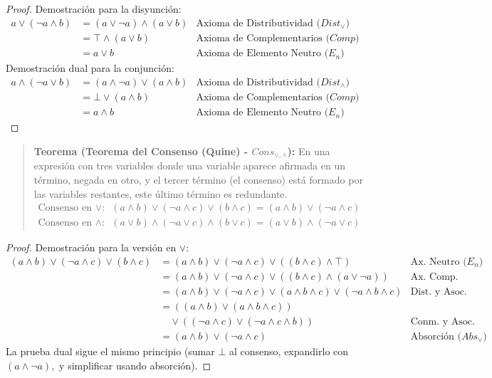 \begin{proof}
Demostración para la disyunción:
\begin{align*}
    a \vee (\neg a \wedge b) &= (a \vee \neg a) \wedge (a \vee b) & \text{Axioma de Distributividad ($Dist_{\vee}$)} \\
    &= \top \wedge (a \vee b) & \text{Axioma de Complementarios ($Comp$)} \\
    &= a \vee b & \text{Axioma de Elemento Neutro ($E_n$)}
\end{align*}
Demostración dual para la conjunción:
\begin{align*}
    a \wedge (\neg a \vee b) &= (a \wedge \neg a) \vee (a \wedge b) & \text{Axioma de Distributividad ($Dist_{\wedge}$)} \\
    &= \bot \vee (a \wedge b) & \text{Axioma de Complementarios ($Comp$)} \\
    &= a \wedge b & \text{Axioma de Elemento Neutro ($E_n$)}
\end{align*}
\end{proof}

\begin{quote}\textbf{Teorema (Teorema del Consenso (Quine) - $Cons_{\vee, \wedge}$):}\label{consenso}
En una expresión con tres variables donde una variable aparece afirmada en un término, negada en otro, y el tercer término (el consenso) está formado por las variables restantes, este último término es redundante.
\begin{align*}
    \text{Consenso en $\vee:$ } & (a \wedge b) \vee (\neg a \wedge c) \vee (b \wedge c) = (a \wedge b) \vee (\neg a \wedge c) \\
    \text{Consenso en $\wedge:$ } & (a \vee b) \wedge (\neg a \vee c) \wedge (b \vee c) = (a \vee b) \wedge (\neg a \vee c)
\end{align*}
\end{quote}

\begin{proof}
Demostración para la versión en $\vee:$
\begin{align*}
    (a \wedge b) \vee (\neg a \wedge c) \vee (b \wedge c) &= (a \wedge b) \vee (\neg a \wedge c) \vee ((b \wedge c) \wedge \top) & \text{Ax. Neutro ($E_n$)} \\
    &= (a \wedge b) \vee (\neg a \wedge c) \vee ((b \wedge c) \wedge (a \vee \neg a)) & \text{Ax. Comp.} \\
    &= (a \wedge b) \vee (\neg a \wedge c) \vee (a \wedge b \wedge c) \vee (\neg a \wedge b \wedge c) & \text{Dist. y Asoc.} \\
    &= ((a \wedge b) \vee (a \wedge b \wedge c)) \\
    &\quad \vee ((\neg a \wedge c) \vee (\neg a \wedge c \wedge b)) & \text{Conm. y Asoc.} \\
    &= (a \wedge b) \vee (\neg a \wedge c) & \text{Absorción ($Abs_{\vee}$)}
\end{align*}
La prueba dual sigue el mismo principio (sumar $\bot$ al consenso, expandirlo con $(a \wedge \neg a),$ y simplificar usando absorción).
\end{proof}

